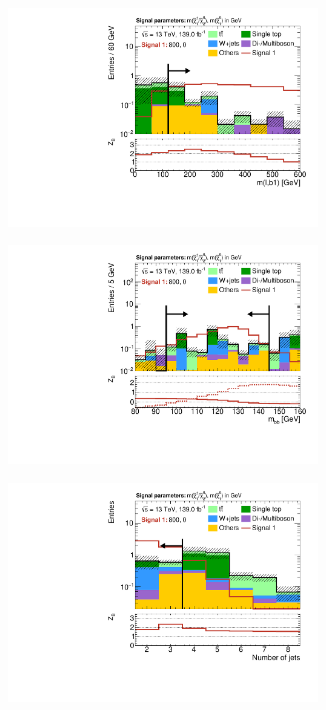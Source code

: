 \begin{figure}
\begin{subfigure}[b]{0.5\linewidth}
	\end{subfigure}\hfill
	\begin{subfigure}[b]{0.5\linewidth}
		\centering\includegraphics[width=0.9\textwidth]{N-1_cut_scan/n1_800_0/mlb1}
	\end{subfigure}\hfill
	\par\medskip
	\begin{subfigure}[b]{0.5\linewidth}
		\centering\includegraphics[width=0.9\textwidth]{N-1_cut_scan/n1_800_0/mbb_both}
	\end{subfigure}\hfill
	\begin{subfigure}[b]{0.5\linewidth}
		\centering\includegraphics[width=0.9\textwidth]{N-1_cut_scan/n1_800_0/nJet30}
	\end{subfigure}


\end{figure}
